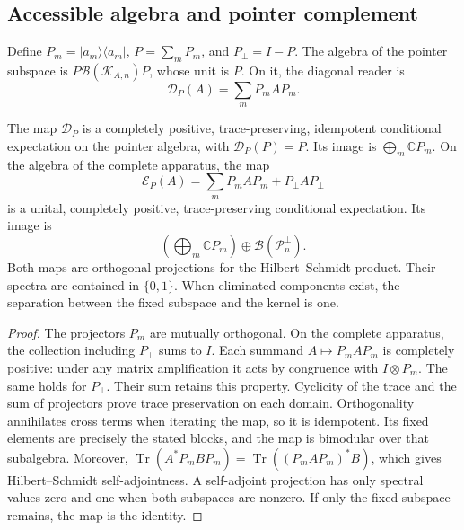\subsection{Accessible algebra and pointer complement}
\label{vii:sec:observador-expectativa}

Define \(P_m=|a_m\rangle\langle a_m|\),
\(P=\sum_mP_m\), and \(P_\perp=I-P\). The algebra of the
pointer subspace is \(P\mathcal B(\mathcal K_{A,n})P\), whose unit is \(P\).
On it, the diagonal reader is
\[
 \mathcal D_P(A)=\sum_mP_mAP_m.
\]

\begin{proposition}
\label{vii:prop:observador-pinzamiento}
The map \(\mathcal D_P\) is a completely positive,
trace-preserving, idempotent conditional expectation on the
pointer algebra, with \(\mathcal D_P(P)=P\). Its image is
\(\bigoplus_m\mathbb CP_m\).
On the algebra of the complete apparatus, the map
\begin{equation}
 \mathcal E_P(A)=\sum_mP_mAP_m+P_\perp AP_\perp
 \label{vii:eq:observador-complemento}
\end{equation}
is a unital, completely positive, trace-preserving
conditional expectation. Its image is
\[
 \left(\bigoplus_m\mathbb CP_m\right)
 \oplus\mathcal B(\mathcal P_n^\perp).
\]
Both maps are orthogonal projections for the Hilbert--Schmidt
product. Their spectra are contained in \(\{0,1\}\).
When eliminated components exist, the separation between the
fixed subspace and the kernel is one.
\end{proposition}

\begin{proof}
The projectors \(P_m\) are mutually orthogonal. On the complete
apparatus, the collection including \(P_\perp\) sums to \(I\). Each summand
\(A\mapsto P_mAP_m\) is completely positive: under any
matrix amplification it acts by congruence with \(I\otimes P_m\).
The same holds for \(P_\perp\). Their sum retains this property.
Cyclicity of the trace and the sum of projectors prove trace
preservation on each domain. Orthogonality annihilates
cross terms when iterating the map, so it is idempotent.
Its fixed elements are precisely the stated blocks, and the
map is bimodular over that subalgebra.
Moreover,
\(\operatorname{Tr}(A^*P_mBP_m)
 =\operatorname{Tr}((P_mAP_m)^*B)\),
which gives Hilbert--Schmidt self-adjointness. A self-adjoint projection
has only spectral values zero and one when both
subspaces are nonzero. If only the fixed subspace remains,
the map is the identity.
\end{proof}

